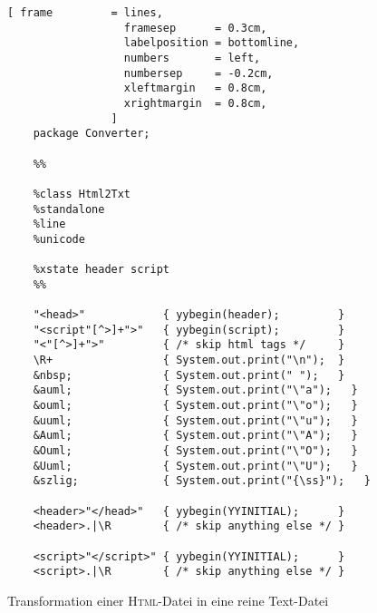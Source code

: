 \begin{figure}[!ht]
\centering
\begin{Verbatim}[ frame         = lines, 
                  framesep      = 0.3cm, 
                  labelposition = bottomline,
                  numbers       = left,
                  numbersep     = -0.2cm,
                  xleftmargin   = 0.8cm,
                  xrightmargin  = 0.8cm,
                ]
    package Converter;
    
    %% 
    
    %class Html2Txt
    %standalone
    %line
    %unicode
    
    %xstate header script
    %%
    
    "<head>"            { yybegin(header);         }
    "<script"[^>]+">"   { yybegin(script);         }
    "<"[^>]+">"         { /* skip html tags */     }
    \R+                 { System.out.print("\n");  }
    &nbsp;              { System.out.print(" ");   }
    &auml;              { System.out.print("\"a");   }
    &ouml;              { System.out.print("\"o");   }
    &uuml;              { System.out.print("\"u");   }
    &Auml;              { System.out.print("\"A");   }
    &Ouml;              { System.out.print("\"O");   }
    &Uuml;              { System.out.print("\"U");   }
    &szlig;             { System.out.print("{\ss}");   }
    
    <header>"</head>"   { yybegin(YYINITIAL);      }
    <header>.|\R        { /* skip anything else */ }
    
    <script>"</script>" { yybegin(YYINITIAL);      }
    <script>.|\R        { /* skip anything else */ }
\end{Verbatim}
\vspace*{-0.3cm}
\caption{Transformation einer \textsc{Html}-Datei in eine reine Text-Datei}
\label{fig:html2txt.jflex}
\end{figure}


